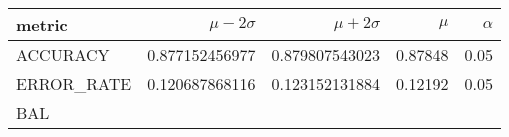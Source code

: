 \documentclass[11pt]{report}
\begin{document}
\begin{table}
    \centering
    \begin{tabular}{lrrrr}
    \hline
    
        \textbf{ metric }
        
           &
        
    
        \textbf{ $\mu - 2\sigma$ }
        
           &
        
    
        \textbf{ $\mu + 2\sigma$ }
        
           &
        
    
        \textbf{ $\mu$ }
        
           &
        
    
        \textbf{ $\alpha$ }
        
     
    \\
    \hline
    
        
            ACCURACY
             
               &
            
        
            0.877152456977
             
               &
            
        
            0.879807543023
             
               &
            
        
            0.87848
             
               &
            
        
            0.05
            
        
        \\
    
        
            ERROR\_RATE
             
               &
            
        
            0.120687868116
             
               &
            
        
            0.123152131884
             
               &
            
        
            0.12192
             
               &
            
        
            0.05
            
        
        \\
    
        
            BAL
             

\end{tabular}
\end{table}
\end{document}
